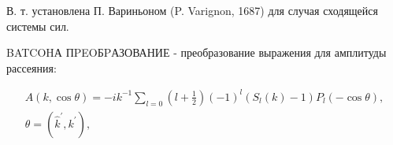 \documentclass[10pt]{article}
\begin{document}
В. т. установлена П. Вариньоном (P. Varignon, 1687) для случая сходящейся системы сил.



BATCOHА ПPEOБPАЗОВАНИЕ - преобразование выражения для амплитуды рассеяния:



\[

\begin{gathered}

A(k, \cos \theta)=-i k^{-1} \sum_{l=0}\left(l+\frac{1}{2}\right)(-1)^{l}\left(S_{l}(k)-1\right) P_{l}(-\cos \theta), \\

\theta=\left(\hat{k}^{\prime}, k^{\prime}\right),

\end{gathered}

\]
\end{document}
